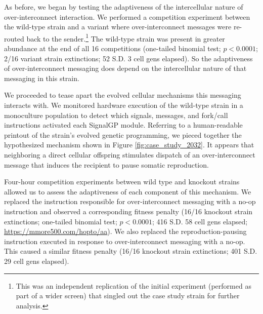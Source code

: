 
As before, we began by testing the adaptiveness of the intercellular nature of over-interconnect interaction. %
We performed a competition experiment between the wild-type strain and a variant where over-interconnect messages were re-routed back to the sender.\footnote{
This was an independent replication of the initial experiment (performed as part of a wider screen) that singled out the case study strain for further analysis.
}
The wild-type strain was present in greater abundance at the end of all 16 competitions (one-tailed binomial test; $p < 0.0001$; 2/16 variant strain extinctions; 52 S.D. 3 cell gens elapsed).
So the adaptiveness of over-interconnect messaging does depend on the intercellular nature of that messaging in this strain.

We proceeded to tease apart the evolved cellular mechanisms this messaging interacts with.
We monitored hardware execution of the wild-type strain in a monoculture population to detect which signals, messages, and fork/call instructions activated each SignalGP module. %
Referring to a human-readable printout of the strain's evolved genetic programming, we pieced together the hypothesized mechanism shown in Figure \ref{fig:case_study_2032}.
It appears that neighboring a direct cellular offspring stimulates dispatch of an over-interconnect message that induces the recipient to pause somatic reproduction.

Four-hour competition experiments between wild type and knockout strains allowed us to assess the adaptiveness of each component of this mechanism.
We replaced the instruction responsible for over-interconnect messaging with a no-op instruction and observed a corresponding fitness penalty (16/16 knockout strain extinctions; one-tailed binomial test; $p < 0.0001$; 416 S.D. 58 cell gens elapsed; \url{https://mmore500.com/hopto/aa}).
We also replaced the reproduction-pausing instruction executed in response to over-interconnect messaging with a no-op.
This caused a similar fitness penalty (16/16 knockout strain extinctions; 401 S.D. 29 cell gens elapsed).

